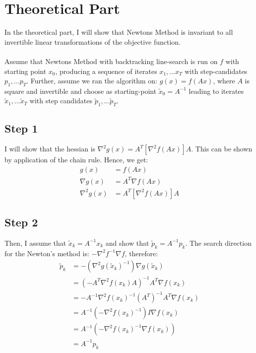 \documentclass[a4paper]{article}
\begin{document}
\section{Theoretical Part}
In the theoretical part, I will show that Newtons
Method is invariant to all invertible linear transformations of the objective
function.\\\\
Assume that Newtons Method with backtracking line-search is run on $f$ with starting point
$x_0$, producing a sequence of iterates $x_1, \dots x_T$
with step-candidates $p_1, \dots p_T$. Further, assume we
ran the algorithm on: $g(x)=f(Ax)$, where $A$ is
square and invertible and choose as starting-point $\tilde{x}_0= A^{-1}$
leading to iterates $\tilde{x}_1, \dots \tilde{x}_T$ with step candidates
$\tilde{p}_1, \dots \tilde{p}_T$.

\subsection{Step 1}
I will show that the hessian is $\nabla^2 g(x)= A^T \left[\nabla^2 f(Ax)\right] A$. This can be shown
by application of the chain rule. Hence, we get:
\begin{align*}
 g(x) &= f(Ax)\\
 \nabla g(x) &= A^T \nabla f(Ax)\\
 \nabla^2 g(x) &= A^T \left[\nabla^2 f(Ax)\right]A
\end{align*}

\subsection{Step 2}
Then, I assume that $\tilde{x}_k= A^{-1} x_k$ and show that
$\tilde{p}_k=A^{-1}p_k$. The search direction for the Newton's method is:
$-\nabla^{2}f^{-1}\nabla f$, therefore:
\[
\begin{aligned}
  \tilde{p}_{k} &=-(\nabla^{2} g\left(\tilde{x}_{k}\right)^{-1}) \nabla g\left(\tilde{x}_{k}\right) \\
  &=\left(-A^T \nabla^{2} f\left(x_{k}\right) A\right)^{-1} A^T \nabla f\left(x_{k}\right) \\
  &=-A^{-1} \nabla^{2} f\left(x_{k}\right)^{-1} (A^T)^{-1} A^T \nabla f\left(x_{k}\right) \\
  &=A^{-1}(- \nabla^{2} f\left(x_{k}\right)^{-1}) I \nabla f\left(x_{k}\right) \\
  &=A^{-1}\left(-\nabla^{2} f\left(x_{k}\right)^{-1} \nabla f\left(x_{k}\right)\right) \\
  &=A^{-1} p_{k}
\end{aligned}
\]
\end{document}

